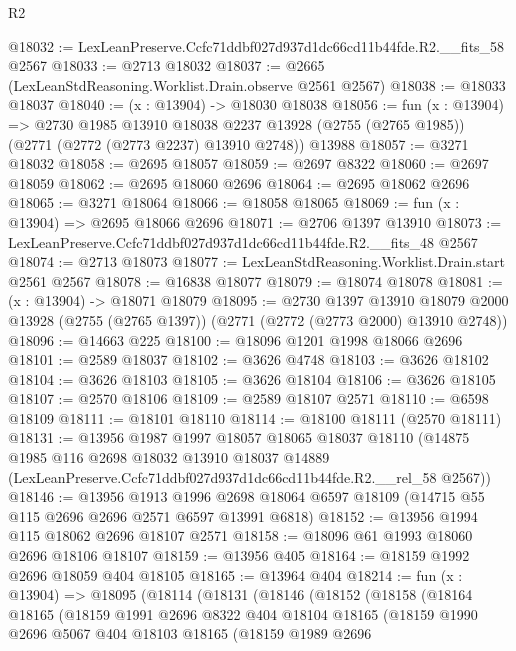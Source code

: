 \begin{lexlean}{R2}
\begin{coremodule}
@18032 := LexLeanPreserve.Ccfc71ddbf027d937d1dc66cd11b44fde.R2.__fits_58 @2567
@18033 := @2713 @18032
@18037 := @2665 (LexLeanStdReasoning.Worklist.Drain.observe @2561 @2567)
@18038 := @18033 @18037
@18040 := (x : @13904) -> @18030 @18038
@18056 := fun (x : @13904) =>
  @2730
    @1985
    @13910
    @18038
    @2237
    @13928
    (@2755 (@2765 @1985))
    (@2771 (@2772 (@2773 @2237) @13910 @2748))
    @13988
@18057 := @3271 @18032
@18058 := @2695 @18057
@18059 := @2697 @8322
@18060 := @2697 @18059
@18062 := @2695 @18060 @2696
@18064 := @2695 @18062 @2696
@18065 := @3271 @18064
@18066 := @18058 @18065
@18069 := fun (x : @13904) => @2695 @18066 @2696
@18071 := @2706 @1397 @13910
@18073 := LexLeanPreserve.Ccfc71ddbf027d937d1dc66cd11b44fde.R2.__fits_48 @2567
@18074 := @2713 @18073
@18077 := LexLeanStdReasoning.Worklist.Drain.start @2561 @2567
@18078 := @16838 @18077
@18079 := @18074 @18078
@18081 := (x : @13904) -> @18071 @18079
@18095 := @2730
    @1397
    @13910
    @18079
    @2000
    @13928
    (@2755 (@2765 @1397))
    (@2771 (@2772 (@2773 @2000) @13910 @2748))
@18096 := @14663 @225
@18100 := @18096 @1201 @1998 @18066 @2696
@18101 := @2589 @18037
@18102 := @3626 @4748
@18103 := @3626 @18102
@18104 := @3626 @18103
@18105 := @3626 @18104
@18106 := @3626 @18105
@18107 := @2570 @18106
@18109 := @2589 @18107 @2571
@18110 := @6598 @18109
@18111 := @18101 @18110
@18114 := @18100 @18111 (@2570 @18111)
@18131 := @13956
    @1987
    @1997
    @18057
    @18065
    @18037
    @18110
    (@14875
      @1985
      @116
      @2698
      @18032
      @13910
      @18037
      @14889
      (LexLeanPreserve.Ccfc71ddbf027d937d1dc66cd11b44fde.R2.__rel_58 @2567))
@18146 := @13956
    @1913
    @1996
    @2698
    @18064
    @6597
    @18109
    (@14715 @55 @115 @2696 @2696 @2571 @6597 @13991 @6818)
@18152 := @13956 @1994 @115 @18062 @2696 @18107 @2571
@18158 := @18096 @61 @1993 @18060 @2696 @18106 @18107
@18159 := @13956 @405
@18164 := @18159 @1992 @2696 @18059 @404 @18105
@18165 := @13964 @404
@18214 := fun (x : @13904) =>
  @18095
    (@18114
      (@18131
        (@18146
          (@18152
            (@18158
              (@18164
                @18165
                (@18159
                  @1991
                  @2696
                  @8322
                  @404
                  @18104
                  @18165
                  (@18159
                    @1990
                    @2696
                    @5067
                    @404
                    @18103
                    @18165
                    (@18159
                      @1989
                      @2696

\end{coremodule}
\end{lexlean}
